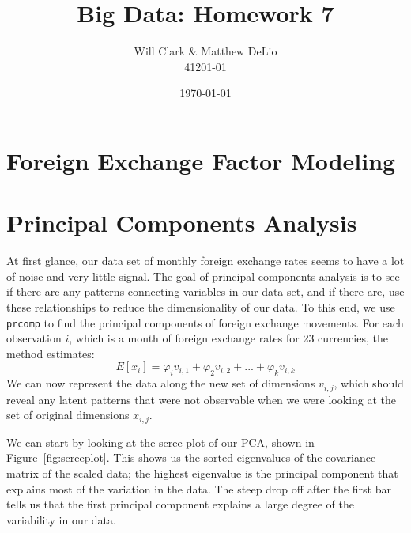 \documentclass[11pt, fleqn]{article}
\begin{document}
\title{Big Data: Homework 7}
\author{Will Clark \& Matthew DeLio \\ 41201-01}
\date{\today}
\maketitle

\section{Foreign Exchange Factor Modeling} \label{sec:intro}


\section{Principal Components Analysis} \label{sec:pca}

At first glance, our data set of monthly foreign exchange rates seems to have a lot of noise and very little signal. The goal of principal components analysis is to see if there are any patterns connecting variables in our data set, and if there are, use these relationships to reduce the dimensionality of our data. To this end, we use \texttt{prcomp} to find the principal components of foreign exchange movements. For each observation $i$, which is a month of foreign exchange rates for 23 currencies, the method estimates:
\begin{equation}
E[x_i] = \varphi_i v_{i,1} + \varphi_2 v_{i,2} + ... + \varphi_k v_{i,k}
\end{equation}
We can now represent the data along the new set of dimensions $v_{i,j}$, which should reveal any latent patterns that were not observable when we were looking at the set of original dimensions $x_{i,j}$.

We can start by looking at the scree plot of our PCA, shown in Figure~\ref{fig:screeplot}. This shows us the sorted eigenvalues of the covariance matrix of the scaled data; the highest eigenvalue is the principal component that explains most of the variation in the data. The steep drop off after the first bar tells us that the first principal component explains a large degree of the variability in our data.
\end{document}
